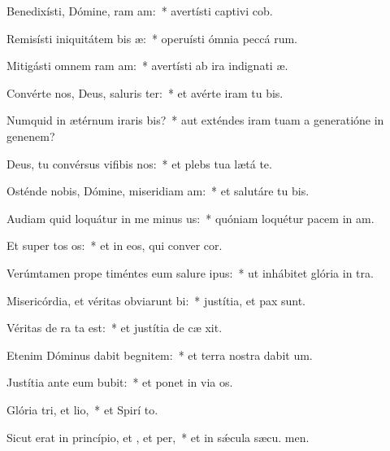 \item Benedixísti, Dómine, ram am:~* avertísti captivi cob.
\item Remisísti iniquitátem bis æ:~* operuísti ómnia peccá rum.
\item Mitigásti omnem ram am:~* avertísti ab ira indignati æ.
\item Convérte nos, Deus, saluris ter:~* et avérte iram tu  bis.
\item Numquid in ætérnum iraris bis?~* aut exténdes iram tuam a generatióne in genenem?
\item Deus, tu convérsus vifibis nos:~* et plebs tua lætá  te.
\item Osténde nobis, Dómine, miseridiam am:~* et salutáre tu  bis.
\item Audiam quid loquátur in me minus us:~* quóniam loquétur pacem in  am.
\item Et super tos os:~* et in eos, qui conver  cor.
\item Verúmtamen prope timéntes eum salure ipus:~* ut inhábitet glória in  tra.
\item Misericórdia, et véritas obviarunt bi:~* justítia, et pax  sunt.
\item Véritas de ra ta est:~* et justítia de cæ xit.
\item Etenim Dóminus dabit begnitem:~* et terra nostra dabit  um.
\item Justítia ante eum bubit:~* et ponet in via  os.
\item Glória tri, et lio,~* et Spirí to.
\item Sicut erat in princípio, et , et per,~* et in sǽcula sæcu. men.
